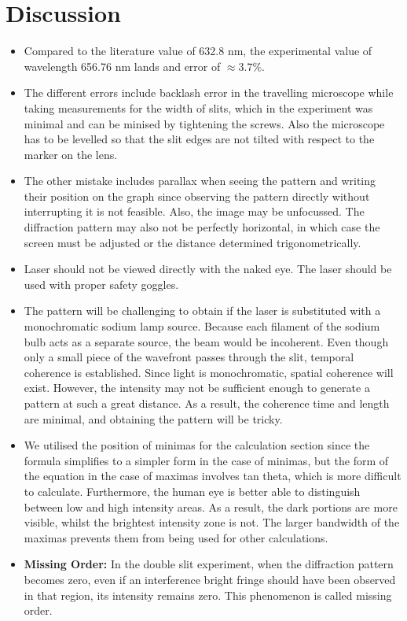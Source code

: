\section{Discussion}

\begin{itemize}
	\item Compared to the literature value of 632.8 nm, the experimental value of wavelength 656.76 nm lands and error of $\approx 3.7\%$.
	\item The different errors include backlash error in the travelling microscope while taking measurements for the width of slits, which in the experiment was minimal and can be minised by tightening the screws. Also the microscope has to be levelled so that the slit edges are not tilted with respect to the marker on the lens.
	\item The other mistake includes parallax when seeing the pattern and writing their position on the graph since observing the pattern directly without interrupting it is not feasible. Also, the image may be unfocussed. The diffraction pattern may also not be perfectly horizontal, in which case the screen must be adjusted or the distance determined trigonometrically.
	\item Laser should not be viewed directly with the naked eye. The laser should be used with proper safety goggles.
	\item The pattern will be challenging to obtain if the laser is substituted with a monochromatic sodium lamp source. Because each filament of the sodium bulb acts as a separate source, the beam would be incoherent. Even though only a small piece of the wavefront passes through the slit, temporal coherence is established. Since light is monochromatic, spatial coherence will exist. However, the intensity may not be sufficient enough to generate a pattern at such a great distance. As a result, the coherence time and length are minimal, and obtaining the pattern will be tricky.
	\item We utilised the position of minimas for the calculation section since the formula simplifies to a simpler form in the case of minimas, but the form of the equation in the case of maximas involves tan theta, which is more difficult to calculate. Furthermore, the human eye is better able to distinguish between low and high intensity areas. As a result, the dark portions are more visible, whilst the brightest intensity zone is not. The larger bandwidth of the maximas prevents them from being used for other calculations.
	\item \textbf{Missing Order:} In the double slit experiment, when the diffraction pattern becomes zero, even if an interference bright fringe should have been observed in that region, its intensity remains zero. This phenomenon is called missing order.

\end{itemize}